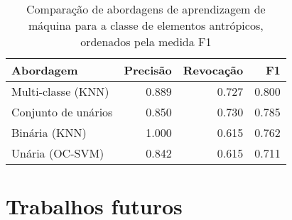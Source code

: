 \begin{table}[h]
\centering
\begin{tabulary}{\linewidth}{|L|R|R|R|}
\hline
\textbf{Abordagem}  & \textbf{Precisão} & \textbf{Revocação} & \textbf{F1} \\ \hline
Multi-classe (KNN)  & 0.889 & 0.727 & 0.800 \\ \hline
Conjunto de unários & 0.850 & 0.730 & 0.785 \\ \hline
Binária (KNN)       & 1.000 & 0.615 & 0.762 \\ \hline
Unária (OC-SVM)     & 0.842 & 0.615 & 0.711 \\ \hline
\end{tabulary}
\caption{Comparação de abordagens de aprendizagem de máquina para a classe de elementos antrópicos, ordenados pela medida F1}
\label{tab:resultadosFinais}
\end{table}



\section{Trabalhos futuros}

